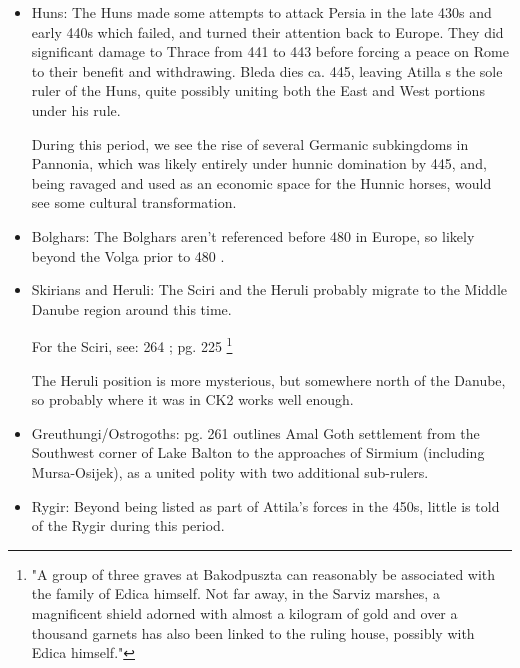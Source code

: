 \documentclass{article}
\newcommand{\specificCite}[1]{\tiny #1 \normalsize}
\begin{document}
	\begin{itemize}
		\item Huns:\newline
		The Huns made some attempts to attack Persia in the late 430s and early 440s which failed, and turned their attention back to Europe.
		They did significant damage to Thrace from 441 to 443 before forcing a peace on Rome to their benefit and withdrawing.
		Bleda dies ca. 445, leaving Atilla s the sole ruler of the Huns, quite possibly uniting both the East and West portions under his rule.
		
		During this period, we see the rise of several Germanic subkingdoms in Pannonia, which was likely entirely under hunnic domination by 445, and, being ravaged and used as an economic space for the Hunnic horses, would see some cultural transformation.
		
		\item Bolghars:\newline
		The Bolghars aren't referenced before 480 in Europe, so likely beyond the Volga prior to 480 \cite{KimHuns}.
		
		\item Skirians and Heruli:\newline
		The Sciri and the Heruli probably migrate to the Middle Danube region around this time.
		
		For the Sciri, see: \cite{WolframHistoryOfTheGoths,ToddEarlyGermans} \specificCite{264}; \specificCite{pg. 225}\footnote{"A group of three graves at Bakodpuszta can reasonably be associated with the family of Edica himself. Not far away, in the Sarviz marshes, a magnificent shield adorned with almost a kilogram of gold and over a thousand garnets has also been linked to the ruling house, possibly with Edica himself."}
		
		The Heruli position is more mysterious, but somewhere north of the Danube, so probably where it was in CK2 works well enough.
		
		\item Greuthungi/Ostrogoths:\newline
		\cite{WolframHistoryOfTheGoths}\specificCite{pg. 261} outlines Amal Goth settlement from the Southwest corner of Lake Balton to the approaches of Sirmium (including Mursa-Osijek), as a united polity with two additional sub-rulers.
		
		\item Rygir:\newline
		Beyond being listed as part of Attila's forces in the 450s, little is told of the Rygir during this period.
		

\end{itemize}
\end{document}
